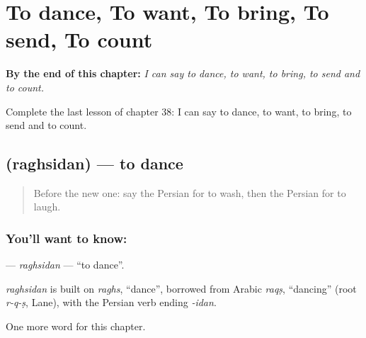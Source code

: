 
\chapter{To dance, To want, To bring, To send, To count}
\label{ch:fa-to-dance-to-want-to-bring-to-send-to-count}

\begin{chapteropening}
\textbf{By the end of this chapter:} \emph{I can say to dance, to want, to bring, to send and to count.}

Complete the last lesson of chapter 38: I can say to dance, to want, to bring, to send and to count.
\end{chapteropening}

\section[\texorpdfstring{\fa{رقصیدن} (raghsidan)}{رقصیدن (raghsidan)}]{ (raghsidan) — to dance}

\label{lesson:FA-C38-raghsidan}



\begin{quote}
Before the new one: say the Persian for to wash, then the Persian for to laugh.
\end{quote}

\subsection*{You'll want to know: }
\textbf{} — \emph{raghsidan} — \textquotedblleft{}to dance\textquotedblright{}.

\begin{cousinweb}
\emph{raghsidan} is built on \emph{raghs}, \textquotedblleft{}dance\textquotedblright{}, borrowed from Arabic \emph{raqṣ}, \textquotedblleft{}dancing\textquotedblright{} (root \emph{r-q-ṣ}, Lane), with the Persian verb ending \emph{-idan}.
\end{cousinweb}

\begin{grammarlens}[title={What you've built}]
One more word for this chapter.
\end{grammarlens}


